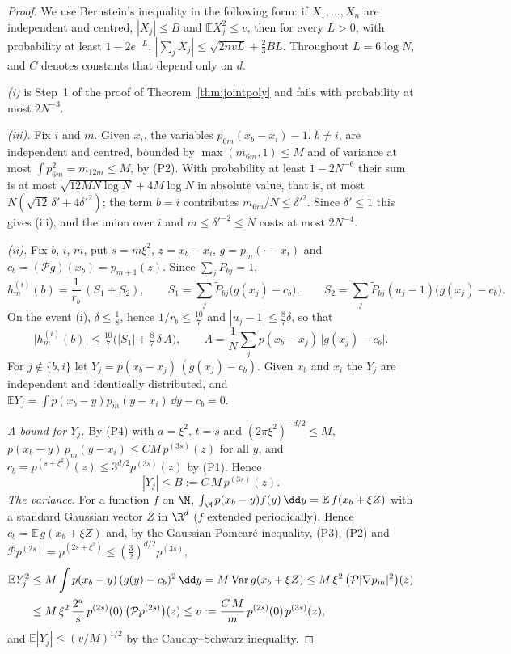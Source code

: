 \begin{proof}
We use Bernstein's inequality in the following form: if $X_1,\dots,X_n$ are independent and centred, $|X_j|\le B$ and $\mathbb EX_j^2\le v$, then for every $L>0$, with probability at least $1-2e^{-L}$, $|\sum_jX_j|\le\sqrt{2nvL}+\frac23BL$. Throughout $L=6\log N$, and $C$ denotes constants that depend only on $d$.

\emph{\textup{(i)}} is Step~1 of the proof of Theorem~\ref{thm:jointpoly} and fails with probability at most $2N^{-3}$.

\emph{\textup{(iii)}.} Fix $i$ and $m$. Given $x_i$, the variables $p_{6m}(x_b-x_i)-1$, $b\ne i$, are independent and centred, bounded by $\max(m_{6m},1)\le M$ and of variance at most $\int p_{6m}^2=m_{12m}\le M$, by (P2). With probability at least $1-2N^{-6}$ their sum is at most $\sqrt{12MN\log N}+4M\log N$ in absolute value, that is, at most $N(\sqrt{12}\,\delta'+4\delta'^2)$; the term $b=i$ contributes $m_{6m}/N\le\delta'^2$. Since $\delta'\le1$ this gives (iii), and the union over $i$ and $m\le\delta'^{-2}\le N$ costs at most $2N^{-4}$.

\emph{\textup{(ii)}.} Fix $b$, $i$, $m$, put $s=m\xi^2$, $z=x_b-x_i$, $g=p_m(\cdot-x_i)$ and $c_b=(\mathcal Pg)(x_b)=p_{m+1}(z)$. Since $\sum_jP_{bj}=1$,
\begin{equation}\label{eq:cons-split}
h^{(i)}_m(b)=\frac1{r_b}\,(S_1+S_2),\qquad S_1=\sum_j\tilde P_{bj}\big(g(x_j)-c_b\big),\qquad S_2=\sum_j\tilde P_{bj}(u_j-1)\big(g(x_j)-c_b\big).
\end{equation}
On the event (i), $\delta\le\frac18$, hence $1/r_b\le\frac{10}7$ and $|u_j-1|\le\frac87\delta$, so that
\[
\big|h^{(i)}_m(b)\big|\le\tfrac{10}7\big(|S_1|+\tfrac87\,\delta\,A\big),\qquad A=\frac1N\sum_jp(x_b-x_j)\,\big|g(x_j)-c_b\big| .
\]
For $j\notin\{b,i\}$ let $Y_j=p(x_b-x_j)\,(g(x_j)-c_b)$. Given $x_b$ and $x_i$ the $Y_j$ are independent and identically distributed, and $\mathbb EY_j=\int p(x_b-y)p_m(y-x_i)\,\dd y-c_b=0$.

\emph{A bound for $Y_j$.} By (P4) with $a=\xi^2$, $t=s$ and $(2\pi\xi^2)^{-d/2}\le M$, $p(x_b-y)\,p_m(y-x_i)\le CM\,p^{(3s)}(z)$ for all $y$, and $c_b=p^{(s+\xi^2)}(z)\le3^{d/2}p^{(3s)}(z)$ by (P1). Hence
\begin{equation}\label{eq:cons-B}
|Y_j|\le B:=C\,M\,p^{(3s)}(z).
\end{equation}
\emph{The variance.} For a function $f$ on $\M$, $\int_\M p(x_b-y)f(y)\,\dd y=\mathbb E\,f(x_b+\xi Z)$ with a standard Gaussian vector $Z$ in $\R^d$ ($f$ extended periodically). Hence $c_b=\mathbb E\,g(x_b+\xi Z)$ and, by the Gaussian Poincar\'e inequality, (P3), (P2) and $\mathcal Pp^{(2s)}=p^{(2s+\xi^2)}\le(\frac32)^{d/2}p^{(3s)}$,
\begin{align}
\mathbb EY_j^2&\le M\int p(x_b-y)\,(g(y)-c_b)^2\,\dd y=M\operatorname{Var}g(x_b+\xi Z)\le M\,\xi^2\,\big(\mathcal P|\nabla p_m|^2\big)(z)\notag\\
&\le M\,\xi^2\,\frac{2^d}{s}\,p^{(2s)}(0)\,\big(\mathcal Pp^{(2s)}\big)(z)\le v:=\frac{C\,M}{m}\,p^{(2s)}(0)\,p^{(3s)}(z),\label{eq:cons-v}
\end{align}
and $\mathbb E|Y_j|\le(v/M)^{1/2}$ by the Cauchy--Schwarz inequality.


\end{proof}

